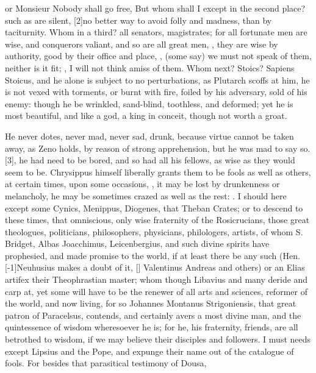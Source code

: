 {or Monsieur Nobody shall go free,  But whom shall I except in the second place? such as are
silent,  [2\baselineskip]no better way to avoid folly
and madness, than by taciturnity. Whom in a third? all senators,
magistrates; for all fortunate men are wise, and conquerors valiant,
and so are all great men, , they are wise
by authority, good by their office and place, , (some say) we must not speak of them, neither is it fit; , I will not think amiss of them. Whom next?
Stoics? Sapiens Stoicus, and he alone is subject to no perturbations,
as Plutarch scoffs at him, he is not vexed with torments, or burnt
with fire, foiled by his adversary, sold of his enemy: though he be
wrinkled, sand-blind, toothless, and deformed; yet he is most
beautiful, and like a god, a king in conceit, though not worth a groat.

He never dotes, never mad, never sad, drunk, because virtue cannot be
taken away, as Zeno holds, by reason of strong apprehension, but
he was mad to say so. [3\baselineskip],
he had need to be bored, and so had all his fellows, as wise as they
would seem to be. Chrysippus himself liberally grants them to be fools
as well as others, at certain times, upon some occasions, , it may be lost by
drunkenness or melancholy, he may be sometimes crazed as well as the
rest: . I should here
except some Cynics, Menippus, Diogenes, that Theban Crates; or to
descend to these times, that omniscious, only wise fraternity of
the Rosicrucians, those great theologues, politicians, philosophers,
physicians, philologers, artists, \etc{} of whom S. Bridget, Albas
Joacchimus, Leicenbergius, and such divine spirits have prophesied, and
made promise to the world, if at least there be any such (Hen.
[-1\baselineskip]Neuhusius makes a doubt of it, [\baselineskip] Valentinus Andreas and
others) or an Elias artifex their Theophrastian master; whom though
Libavius and many deride and carp at, yet some will have to be the
renewer of all arts and sciences, reformer of the world, and now
living, for so Johannes Montanus Strigoniensis, that great patron of
Paracelsus, contends, and certainly avers a most divine man, and
the quintessence of wisdom wheresoever he is; for he, his fraternity,
friends, \etc{} are all betrothed to wisdom, if we may believe their
disciples and followers. I must needs except Lipsius and the Pope, and
expunge their name out of the catalogue of fools. For besides that
parasitical testimony of Dousa,

}

